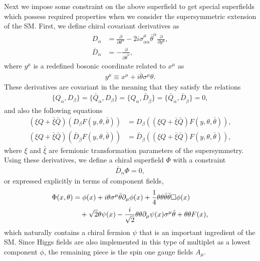 \documentclass[12pt,twoside,book]{article}
\begin{document}
Next we impose some constraint on the above superfield to get special superfields which possess required properties when we consider the supersymmetric extension of the SM.
First, we define chiral covariant derivatives as
\begin{align}
  D_\alpha &= \frac{\partial}{\partial \theta^\alpha} -
  2i\sigma^\mu_{\alpha \dot{\alpha}} \bar{\theta}^{\dot{\alpha}}
  \frac{\partial}{\partial y^\mu}, \\
  \bar{D}_{\dot{\alpha}} &= - \frac{\partial}{\partial \bar{\theta}^{\dot{\alpha}}},
\end{align}
where $y^\mu$ is a redefined bosonic coordinate related to $x^\mu$ as
\begin{align}
  y^\mu \equiv x^\mu + i\bar{\theta} \sigma^\mu \theta.
\end{align}
These derivatives are covariant in the meaning that they satisfy the relations
\begin{align}
  \{ Q_\alpha, D_\beta \} = \{ \bar{Q}_{\dot{\alpha}}, D_\beta \} = \{
  Q_\alpha, \bar{D}_{\dot{\beta}} \} = \{ \bar{Q}_{\dot{\alpha}},
  \bar{D}_{\dot{\beta}} \} = 0,
\end{align}
and also the following equations
\begin{align}
  (\xi Q + \bar{\xi} \bar{Q}) (D_\beta F(y,\theta,\bar{\theta})) &=
  D_\beta ((\xi Q + \bar{\xi} \bar{Q}) F(y,\theta,\bar{\theta})), \\
  (\xi Q + \bar{\xi} \bar{Q}) (\bar{D}_{\dot{\beta}}
  F(y,\theta,\bar{\theta})) &= \bar{D}_{\dot{\beta}} ((\xi Q +
  \bar{\xi} \bar{Q}) F(y,\theta,\bar{\theta})),
\end{align}
where $\xi$ and $\bar{\xi}$ are fermionic transformation parameters of the supersymmetry.
Using these derivatives, we define a chiral superfield $\Phi$ with a constraint
\begin{align}
  \bar{D}_{\dot{\alpha}} \Phi = 0,
\end{align}
or expressed explicitly in terms of component fields,
\begin{align}
  \Phi(x,\theta) &=  \phi(x) + i\theta \sigma^\mu \bar{\theta} \partial_\mu \phi(x) +
  \frac{1}{4} \theta\theta\bar{\theta}\bar{\theta} \Box \phi(x) \notag \\
  &\quad + \sqrt{2} \theta \psi(x) - \frac{i}{\sqrt{2}} \theta\theta
  \partial_\mu \psi(x) \sigma^\mu \bar{\theta} + \theta\theta F(x),\label{chiralsuperf}
\end{align}
which naturally contains a chiral fermion $\psi$ that is an important ingredient of the SM.
Since Higgs fields are also implemented in this type of multiplet as a lowest component $\phi$, the remaining piece is the spin one gauge fields $A_\mu$.
\end{document}
